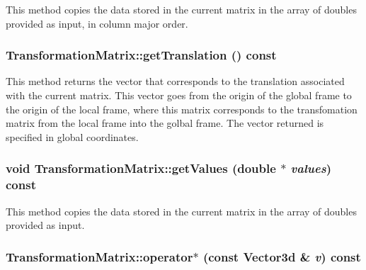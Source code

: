 \label{classCartWheel_1_1Math_1_1TransformationMatrix_a0edba5cf54cf8c0330acdfcedaf664f2}
This method copies the data stored in the current matrix in the array of doubles provided as input, in column major order. \hypertarget{classCartWheel_1_1Math_1_1TransformationMatrix_a6eb44eb662417bb784567e3fb1c1b87e}{
\subsubsection[{getTranslation}]{ TransformationMatrix::getTranslation () const}}
\label{classCartWheel_1_1Math_1_1TransformationMatrix_a6eb44eb662417bb784567e3fb1c1b87e}
This method returns the vector that corresponds to the translation associated with the current matrix. This vector goes from the origin of the global frame to the origin of the local frame, where this matrix corresponds to the transfomation matrix from the local frame into the golbal frame. The vector returned is specified in global coordinates. \hypertarget{classCartWheel_1_1Math_1_1TransformationMatrix_ab66e3548ed04ac0779652b6ad69096e2}{
\subsubsection[{getValues}]{\setlength{\rightskip}{0pt plus 5cm}void TransformationMatrix::getValues (double $\ast$ {\em values}) const}}
\label{classCartWheel_1_1Math_1_1TransformationMatrix_ab66e3548ed04ac0779652b6ad69096e2}
This method copies the data stored in the current matrix in the array of doubles provided as input. \hypertarget{classCartWheel_1_1Math_1_1TransformationMatrix_ac2b10ebee0e90020af600324b29174a5}{
\subsubsection[{operator$\ast$}]{ TransformationMatrix::operator$\ast$ (const {\bf Vector3d} \& {\em v}) const}}
